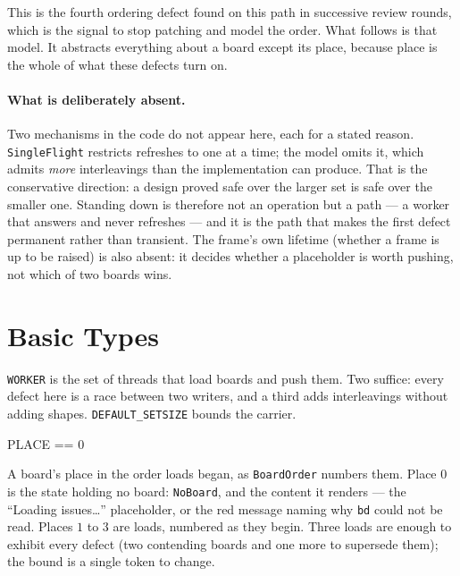 \documentclass[a4paper,10pt,fleqn]{article}
\begin{document}
This is the fourth ordering defect found on this path in successive review
rounds, which is the signal to stop patching and model the order. What follows
is that model. It abstracts everything about a board except its place, because
place is the whole of what these defects turn on.

\paragraph{What is deliberately absent.}
Two mechanisms in the code do not appear here, each for a stated reason.
\texttt{SingleFlight} restricts refreshes to one at a time; the model omits it,
which admits \emph{more} interleavings than the implementation can produce. That
is the conservative direction: a design proved safe over the larger set is safe
over the smaller one. Standing down is therefore not an operation but a path ---
a worker that answers and never refreshes --- and it is the path that makes the
first defect permanent rather than transient. The frame's own lifetime (whether
a frame is up to be raised) is also absent: it decides whether a placeholder is
worth pushing, not which of two boards wins.

\section{Basic Types}

\begin{zed}
  [WORKER]
\end{zed}

\texttt{WORKER} is the set of threads that load boards and push them. Two
suffice: every defect here is a race between two writers, and a third adds
interleavings without adding shapes. \texttt{DEFAULT\_SETSIZE} bounds the
carrier.

\begin{zed}
  PLACE == 0 
\end{zed}

A board's place in the order loads began, as \texttt{BoardOrder} numbers them.
Place $0$ is the state holding no board: \texttt{NoBoard}, and the content it
renders --- the ``Loading issues\ldots'' placeholder, or the red message naming
why \texttt{bd} could not be read. Places $1$ to $3$ are loads, numbered as they
begin. Three loads are enough to exhibit every defect (two contending boards and
one more to supersede them); the bound is a single token to change.
\end{document}
